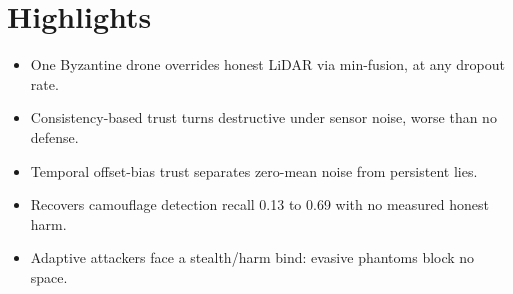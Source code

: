 \documentclass{article}
\begin{document}
\section*{Highlights}
\begin{itemize}
  \item One Byzantine drone overrides honest LiDAR via min-fusion, at any dropout rate. %
  \item Consistency-based trust turns destructive under sensor noise, worse than no defense. %
  \item Temporal offset-bias trust separates zero-mean noise from persistent lies. %
  \item Recovers camouflage detection recall 0.13 to 0.69 with no measured honest harm. %
  \item Adaptive attackers face a stealth/harm bind: evasive phantoms block no space. %
\end{itemize}
\end{document}
